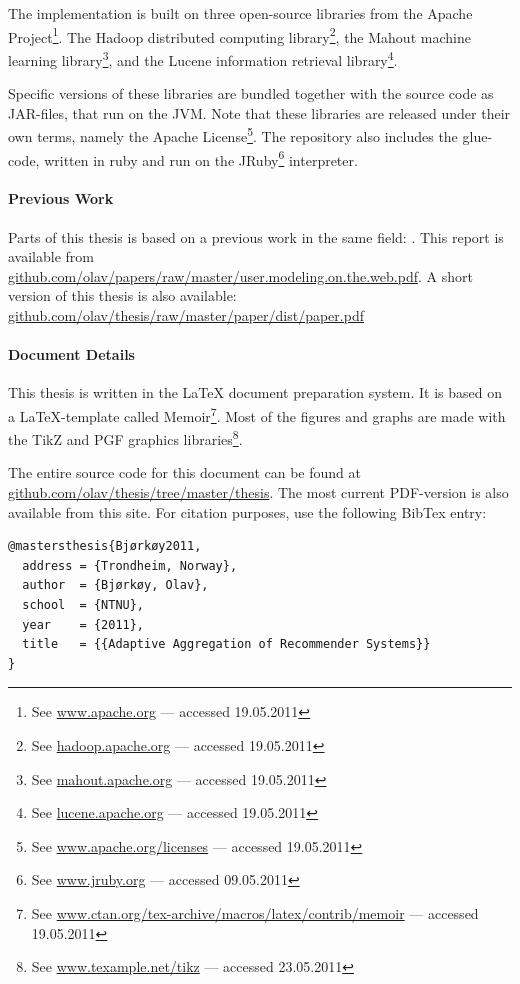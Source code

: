 The implementation is built on three open-source libraries from the
Apache Project\footnote{See \url{www.apache.org} --- accessed 19.05.2011}.
The Hadoop distributed computing library\footnote{See \url{hadoop.apache.org} --- accessed 19.05.2011},
the Mahout machine learning library\footnote{See \url{mahout.apache.org} --- accessed 19.05.2011},
and the Lucene information retrieval library\footnote{See \url{lucene.apache.org} --- accessed 19.05.2011}.

Specific versions of these libraries are bundled together with
the source code as JAR-files, that run on the JVM.
Note that these libraries are released under their own terms,
namely the Apache License\footnote{
See \url{www.apache.org/licenses} --- accessed 19.05.2011}.
The repository also includes the glue-code, written in ruby and run on the JRuby\footnote{
See \url{www.jruby.org} --- accessed 09.05.2011} interpreter.

\paragraph{Previous Work}
Parts of this thesis is based on a previous work in the same field:
\cite{Bjorkoy2010d}. This report is available from
\url{github.com/olav/papers/raw/master/user.modeling.on.the.web.pdf}.
A short version of this thesis is also available:
\url{github.com/olav/thesis/raw/master/paper/dist/paper.pdf}

\paragraph{Document Details}
This thesis is written in the LaTeX document preparation system.
It is based on a LaTeX-template called Memoir\footnote{
See \url{www.ctan.org/tex-archive/macros/latex/contrib/memoir} --- accessed 19.05.2011}.
Most of the figures and graphs are made with the TikZ and PGF graphics libraries\footnote{
See \url{www.texample.net/tikz} --- accessed 23.05.2011}.

The entire source code for this document can be found at 
\url{github.com/olav/thesis/tree/master/thesis}.
The most current PDF-version is also available from this site.
For citation purposes, use the following BibTex entry:

{
\footnotesize
\begin{verbatim}
@mastersthesis{Bjørkøy2011,
  address = {Trondheim, Norway},
  author  = {Bjørkøy, Olav},
  school  = {NTNU},
  year    = {2011},
  title   = {{Adaptive Aggregation of Recommender Systems}}
} 
\end{verbatim}
}

